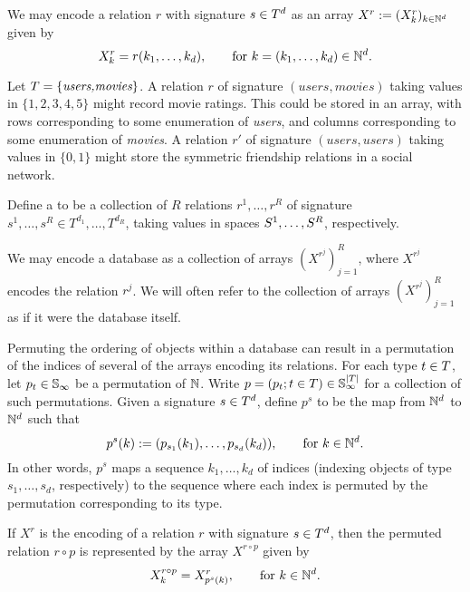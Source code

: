 We may encode a relation $r$ with signature $s \in T^d$ as an array $X^r := (X^r_{k})_{k \in \mathbb{N}^d}$ given by
\[
X^r_{k} = r(k_1,\dotsc,k_d), \qquad \text{for } k = (k_1,\dotsc, k_d) \in \mathbb{N}^d.
\]

\begin{example} 
Let $T = \{\textit{users,movies}\}$.
A relation $r$ of signature $(\textit{users},\textit{movies})$ taking values in $\{1,2,3,4,5\}$ might record movie ratings.
This could be stored in an array, with rows corresponding to some enumeration of \textit{users}, and columns corresponding to some enumeration of \textit{movies}. 
A relation $r'$ of signature $(\textit{users},\textit{users})$ taking values in $\{0,1\}$ might store the symmetric friendship relations in a social network.
\end{example}

\begin{definition}[database]
Define a  to be a collection of $R$ relations $r^1,\dotsc,r^R$ of signature $s^1,\dotsc,s^R \in T^{d_1},\dotsc,T^{d_R}$, taking values in spaces $S^1,\dotsc,S^R$, respectively.
\end{definition}

We may encode a database as a collection of arrays $(X^{r^j})_{j=1}^R$, where $X^{r^j}$ encodes the relation $r^j$.  
We will often refer to the collection of arrays $(X^{r^j})_{j=1}^R$ as if it were the database itself.

Permuting the ordering of objects within a database can result in a permutation of the indices of several of the arrays encoding its relations.
For each type $t \in T$, let $p_t \in \mathbb{S}_{\infty}$ be a permutation of $\mathbb{N}$. 
Write $p = (p_t ; t \in T) \in \mathbb{S}_{\infty}^{|T|}$ for a collection of such permutations.
Given a signature $s \in T^{d}$, define $p^s$ to be the map from $\mathbb{N}^{d}$ to $\mathbb{N}^{d}$ such that
\[
p^s(k) := (p_{s_1}(k_1), \dotsc,p_{s_{d}}(k_{d})), \qquad \text{for } k \in \mathbb{N}^{d}.
\]
In other words, $p^s$ maps a sequence $k_1,\dotsc,k_d$ of indices (indexing objects of type $s_1,\dotsc,s_d$, respectively) to the sequence where each index is permuted by the permutation corresponding to its type.

If $X^r$ is the encoding of a relation $r$ with signature $s \in T^d$, then the permuted relation $r \circ p$ is represented by the array $X^{r\circ p}$ given by
\[
X^{r \circ p}_{k} = X^r_{p^s(k)}, \qquad \text{for } k \in \mathbb{N}^d. \label{eq:arrays:arrayperm}
\]

